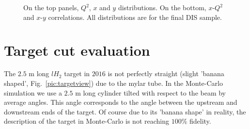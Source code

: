 \begin{figure}[!h]
	\caption{On the top panels, $Q^2$, $x$ and $y$ distributions. On the bottom, $x$-$Q^2$ and $x$-$y$ correlations. All distributions are for the final DIS sample.}
	\label{pic:DISdist}
\end{figure}


\section{Target cut evaluation} \label{sec:targetcut}

The $2.5$ m long $lH_2$ target in $2016$ is not perfectly straight (slight 'banana shaped', Fig.~\ref{pic:targetview}) due to the mylar tube. In the Monte-Carlo simulation we use a $2.5$ m long cylinder tilted with respect to the beam by average angles. This angle corresponds to the angle between the upstream and downstream ends of the target. Of course due to its 'banana shape' in reality, the description of the target in Monte-Carlo is not reaching $100$\% fidelity.

